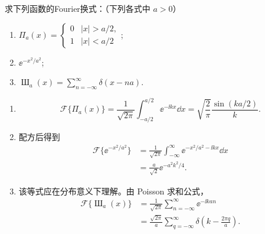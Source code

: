 \begin{question}
求下列函数的Fourier换式：（下列各式中 \(a>0\)）
\begin{enumerate}
  \item \(\Pi_a(x)=\begin{cases}0 & |x|>a/2,\\ 1 & |x|<a/2\end{cases}\);
  \item \(\ee^{-x^2/a^2}\);
  \item \(\operatorname{Ш}_a(x)=\displaystyle\sum_{n=-\infty}^\infty \delta(x-n a)\).
\end{enumerate}
\begin{solution}
\begin{enumerate}
  \item
  \[
  \mathcal{F}\{\Pi_a(x)\}
  =\frac1{\sqrt{2\pi}}\int_{-a/2}^{a/2}\ee^{-\ii kx}\dd{x}
  =\sqrt{\frac2\pi}\frac{\sin(ka/2)}{k}.
  \]

  \item 配方后得到
  \[
  \begin{aligned}
  \mathcal{F}\{\ee^{-x^2/a^2}\}
  &=\frac1{\sqrt{2\pi}}\int_{-\infty}^\infty
    \ee^{-x^2/a^2-\ii kx}\dd{x}\\
  &=\frac{a}{\sqrt2}\ee^{-a^2k^2/4}.
  \end{aligned}
  \]

  \item 该等式应在分布意义下理解。由 Poisson 求和公式，
  \[
  \begin{aligned}
  \mathcal{F}\{\operatorname{Ш}_a(x)\}
  &=\frac1{\sqrt{2\pi}}\sum_{n=-\infty}^\infty\ee^{-\ii kan}\\
  &=\frac{\sqrt{2\pi}}{a}
    \sum_{q=-\infty}^\infty
    \delta\left(k-\frac{2\pi q}{a}\right).
  \end{aligned}
  \]
\end{enumerate}
\end{solution}
\end{question}

